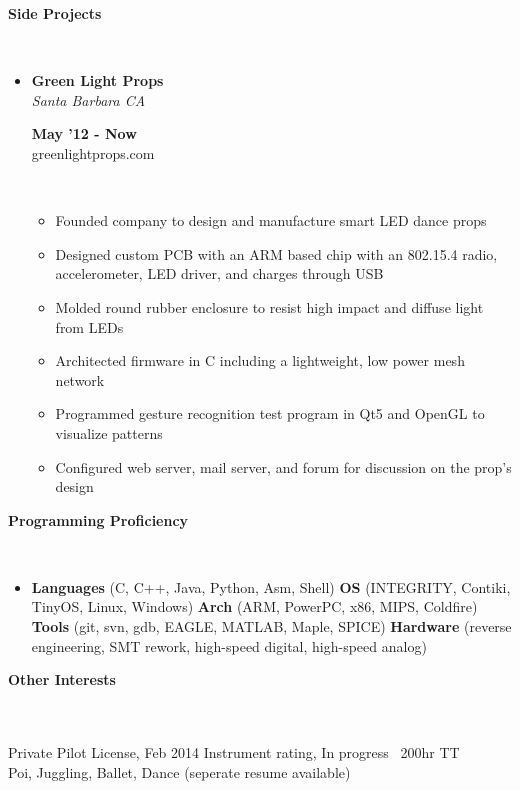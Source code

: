 \documentclass[a4paper,11pt]{article}
\newcommand{\lsep}{-0.5cm}
\newcommand{\resheading}[1]{{\small \colorbox{mygrey}{\begin{minipage}{0.975\textwidth}{\textbf{#1 \vphantom{p\^{E}}}}\end{minipage}}}}
\newcommand{\workexp}[4]{
\begin{minipage}[t]{7cm}
\begin{flushleft}
\textbf{#1} \\
\indent \emph{#2}\\
\end{flushleft}
\end{minipage}
\hfill
\begin{minipage}[t]{7cm}
\begin{flushright}
\textbf{#3} \\
\indent #4 \\
\end{flushright}
\end{minipage}
}
\begin{document}

\resheading{\textbf{Side Projects}}\\[\lsep]

\begin{itemize}
\item \workexp{Green Light Props}{Santa Barbara CA}{May '12 - Now}{greenlightprops.com}
\\[-0.2cm]
	\begin{itemize}
	\item Founded company to design and manufacture smart LED dance props
	\item Designed custom PCB with an ARM based chip with an 802.15.4 radio, accelerometer, LED driver, and charges through USB
	\item Molded round rubber enclosure to resist high impact and diffuse light from LEDs
	\item Architected firmware in C including a lightweight, low power mesh network
	\item Programmed gesture recognition test program in Qt5 and OpenGL to visualize patterns
	\item Configured web server, mail server, and forum for discussion on the prop's design
	\end{itemize}
\end{itemize}



\resheading{\textbf{Programming Proficiency} }\\[\lsep]
\begin{itemize}
\item \noindent \textbf{Languages} (C, C++, Java, Python, Asm, Shell)  
\textbf{OS} (INTEGRITY, Contiki, TinyOS, Linux, Windows) 
\textbf{Arch} (ARM, PowerPC, x86, MIPS, Coldfire) 
\textbf{Tools} (git, svn, gdb, EAGLE, MATLAB, Maple, SPICE) 
\textbf{Hardware} (reverse engineering, SMT rework, high-speed digital, high-speed analog)
\end{itemize}



\resheading{\textbf{Other Interests} }\\[\lsep]
\\[0.2cm]
\indent Private Pilot License, Feb 2014 \indent Instrument rating, In progress \indent ~200hr TT\\
\indent Poi, Juggling, Ballet, Dance (seperate resume available)
\end{document}
